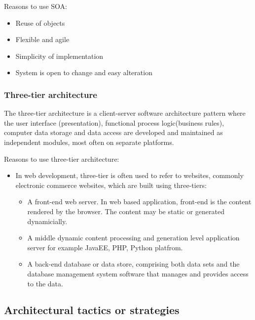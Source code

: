 \documentclass[11pt]{article}
\begin{document}
	Reasons to use SOA:
	\begin{itemize}
		\item Reuse of objects
		\item Flexible and agile
		\item Simplicity of implementation
		\item System is open to change and easy alteration

	\end{itemize}
	
	\subsubsection{Three-tier architecture}
	The three-tier architecture is a client-server software architecture pattern where the user interface (presentation), functional process logic(business rules), computer data storage and data access are developed and maintained as independent modules, most often on separate platforms.

	Reasons to use three-tier architecture:
	\begin{itemize}
		\item In web development, three-tier is often used to refer to websites, commonly electronic commerce websites, which are built using three-tiers:
		\begin{itemize}
			\item A front-end web server. In web based application, front-end is the content rendered by the browser. The content may be static or generated dynamicially.
			\item A middle dynamic content processing and generation level application server for example JavaEE, PHP, Python platfrom.
			\item A back-end database or data store, comprising both data sets and the database management system software that manages and provides access to the data.
		\end{itemize}
	\end{itemize}

	\subsection{Architectural tactics or strategies}
	
\end{document}
